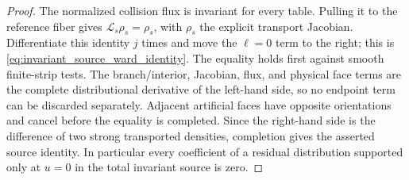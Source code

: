 \documentclass[11pt]{amsart}
\theoremstyle{compactplain}
\theoremstyle{compactdefinition}
\theoremstyle{compactremark}
\newcommand{\Ltransfer}{\mathscr L}
\begin{document}
\begin{proof}
The normalized collision flux is invariant for every table.  Pulling it to the
reference fiber gives \(\Ltransfer_s\rho_s=\rho_s\), with \(\rho_s\) the
explicit transport Jacobian.  Differentiate this identity \(j\) times and move
the \(\ell=0\) term to the right; this is
\eqref{eq:invariant_source_ward_identity}.  The equality holds first against
smooth finite-strip tests.  The branch/interior, Jacobian, flux, and physical
face terms are the complete distributional derivative of the left-hand side,
so no endpoint term can be discarded separately.  Adjacent artificial faces
have opposite orientations and cancel before the equality is completed.
Since the right-hand side is the difference of two strong transported
densities, completion gives the asserted source identity.  In particular every
coefficient of a residual distribution supported only at \(u=0\) in the total
invariant source is zero.
\end{proof}
\end{document}
